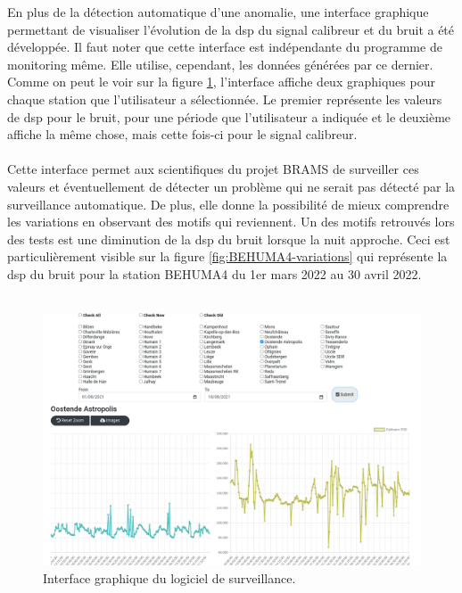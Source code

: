 \documentclass[11pt]{article}
\begin{document}
En plus de la détection automatique d'une anomalie, une interface graphique permettant de visualiser l'évolution de la dsp du signal calibreur et du bruit a été développée.
Il faut noter que cette interface est indépendante du programme de monitoring même.
Elle utilise, cependant, les données générées par ce dernier.
Comme on peut le voir sur la figure  \ref{fig:monitoring-ui}, l'interface affiche deux graphiques pour chaque station que l'utilisateur a sélectionnée.
Le premier représente les valeurs de dsp pour le bruit, pour une période que l'utilisateur a indiquée et le deuxième affiche la même chose, mais cette fois-ci pour le signal calibreur.\\
\\
Cette interface permet aux scientifiques du projet BRAMS de surveiller ces valeurs et éventuellement de détecter un problème qui ne serait pas détecté par la surveillance automatique.
De plus, elle donne la possibilité de mieux comprendre les variations en observant des motifs qui reviennent.
Un des motifs retrouvés lors des tests est une diminution de la dsp du bruit lorsque la nuit approche.
Ceci est particulièrement visible sur la figure \ref{fig:BEHUMA4-variations} qui représente la dsp du bruit pour la station BEHUMA4 du 1er mars 2022 au 30 avril 2022.\\
\\
\begin{figure}[hpt]
    \begin{center}
        \includegraphics[scale=0.22]{monitoring_ui.png}
        \caption{Interface graphique du logiciel de surveillance.}
        \label{fig:monitoring-ui}
    \end{center}
\end{figure}
\end{document}
